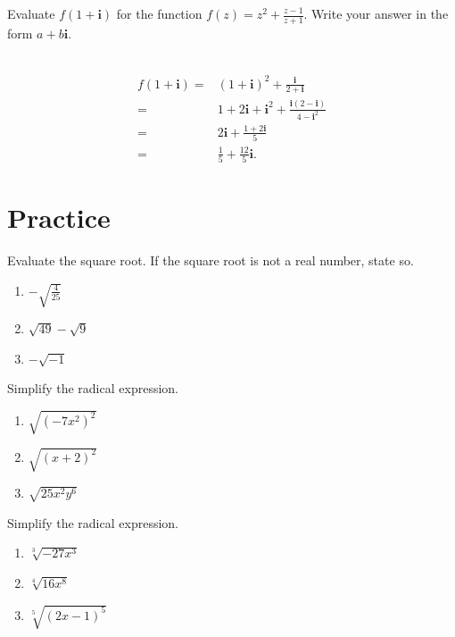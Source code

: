 \documentclass[en,12pt]{elegantbook}
\providecommand{\tightlist}{%
  \setlength{\itemsep}{0pt}\setlength{\parskip}{0pt}}
\newcommand{\ii}{\mathbf{i}}
\let\BeginKnitrBlock\begin \let\EndKnitrBlock\end
\begin{document}
\BeginKnitrBlock{example}
\protect\hypertarget{exm:unnamed-chunk-96}{}{\label{exm:unnamed-chunk-96} }
Evaluate \(f(1+\ii)\) for the function \(f(z)=z^2+\frac{z-1}{z+1}\). Write your answer in the form \(a+b\ii\).
\EndKnitrBlock{example}

\BeginKnitrBlock{solution}
{}\\

\[
\begin{aligned}
f(1+\ii)=&(1+\ii)^2+\frac{\ii}{2+\ii}\\
=&1+2\ii+\ii^2+\frac{\ii(2-\ii)}{4-\ii^2}\\
=&2\ii+\frac{1+2\ii}{5}\\
=&\frac15+\frac{12}{5}\ii.
\end{aligned}
\]
\EndKnitrBlock{solution}

\hypertarget{practice-3}{%
\section{Practice}\label{practice-3}}

\BeginKnitrBlock{exercise}
\protect\hypertarget{exr:unnamed-chunk-98}{}{\label{exr:unnamed-chunk-98} }
Evaluate the square root. If the square root is not a real number, state so.

\begin{enumerate}
\def\labelenumi{\arabic{enumi}.}
\tightlist
\item
  \(-\sqrt{\frac{4}{25}}\)
\item
  \(\sqrt{49}-\sqrt{9}\)
\item
  \(-\sqrt{-1}\)\null
\end{enumerate}
\EndKnitrBlock{exercise}

\BeginKnitrBlock{exercise}
\protect\hypertarget{exr:unnamed-chunk-99}{}{\label{exr:unnamed-chunk-99} }
Simplify the radical expression.

\begin{enumerate}
\def\labelenumi{\arabic{enumi}.}
\tightlist
\item
  \(\sqrt{(-7x^2)^2}\)
\item
  \(\sqrt{(x+2)^2}\)
\item
  \(\sqrt{25x^2y^6}\)
\end{enumerate}
\EndKnitrBlock{exercise}

\BeginKnitrBlock{exercise}
\protect\hypertarget{exr:unnamed-chunk-100}{}{\label{exr:unnamed-chunk-100} }
Simplify the radical expression.

\begin{enumerate}
\def\labelenumi{\arabic{enumi}.}
\tightlist
\item
  \(\sqrt[3]{-27x^3}\)
\item
  \(\sqrt[4]{16x^8}\)
\item
  \(\sqrt[5]{(2x-1)^5}\)
\end{enumerate}
\EndKnitrBlock{exercise}
\end{document}
